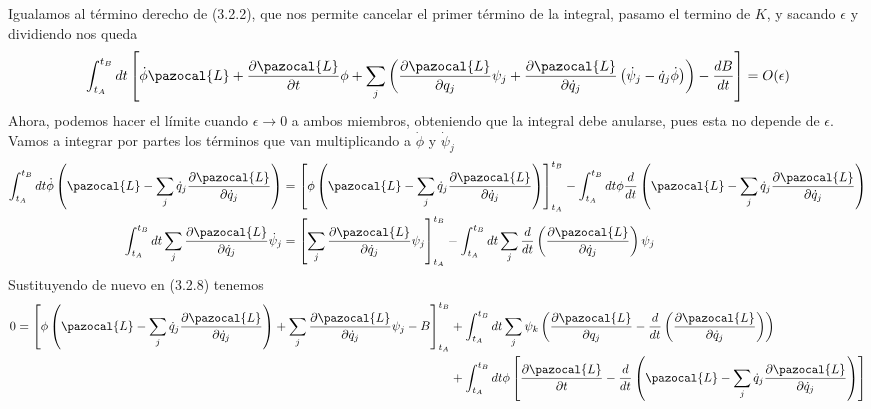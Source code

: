 Igualamos al término derecho de (3.2.2), que nos permite cancelar el primer término de la integral, pasamo el termino de $K$, y sacando $\epsilon$ y dividiendo nos queda
\begin{equation} \label{3.3.2}
    \int_{t_A}^{t_B} dt\left[\dot{\phi}\pazocal{L} +\frac{\partial \pazocal{L}}{\partial t}\phi +\sum_j \left(\frac{\partial \pazocal{L}}{\partial q_j} \psi_j + \frac{\partial \pazocal{L}}{\partial \dot{q}_j} \left(\dot{\psi}_j-\dot{q}_j \dot{\phi}\right)\right)- \frac{dB}{dt}\right] = O(\epsilon)
\end{equation} 
Ahora, podemos hacer el límite cuando $\epsilon \rightarrow 0$ a ambos miembros, obteniendo que la integral debe anularse, pues esta no depende de $\epsilon$. Vamos a integrar por partes los términos que van multiplicando a $\dot{\phi}$ y $\dot{\psi}_j$
\begin{equation} \label{3.3.2}
    \begin{split}
        \int_{t_A}^{t_B} dt \dot{\phi}\left(\pazocal{L}-\sum_j \dot{q}_j\frac{\partial \pazocal{L}}{\partial \dot{q}_j}\right) & = \left[\phi \left(\pazocal{L}-\sum_j \dot{q}_j\frac{\partial \pazocal{L}}{\partial \dot{q}_j}\right) \right]_{t_A}^{t_B} - \int_{t_A}^{t_B} dt \phi \frac{d}{dt}\left(\pazocal{L}-\sum_j \dot{q}_j\frac{\partial \pazocal{L}}{\partial \dot{q}_j}\right) \\ 
        \int_{t_A}^{t_B} dt \sum_j \frac{\partial \pazocal{L}}{\partial \dot{q}_j} \dot{\psi}_j & = \left[\sum_j \frac{\partial \pazocal{L}}{\partial \dot{q}_j} \psi_j\right]_{t_A}^{t_B} - \int_{t_A}^{t_B} dt \sum_j \frac{d}{dt}\left(\frac{\partial \pazocal{L}}{\partial \dot{q}_j}\right) \psi_j
    \end{split}  
\end{equation} 
Sustituyendo de nuevo en (3.2.8) tenemos
\begin{equation} \label{3.3.2}
    \begin{split}
        0 =  \left[ \phi \left(\pazocal{L}-\sum_j \dot{q}_j\frac{\partial \pazocal{L}}{\partial \dot{q}_j}\right) +\sum_j \frac{\partial \pazocal{L}}{\partial \dot{q}_j} \psi_j - B\right]_{t_A}^{t_B} & +  \int_{t_A}^{t_B} dt \sum_j \psi_k \left(\frac{\partial \pazocal{L}}{\partial q_j}-\frac{d}{dt}\left(\frac{\partial \pazocal{L}}{\partial \dot{q}_j}\right)\right) \\ 
        &+\int_{t_A}^{t_B} dt \phi\left[\frac{\partial \pazocal{L}}{\partial t} -\frac{d}{dt}\left(\pazocal{L}-\sum_j \dot{q}_j\frac{\partial \pazocal{L}}{\partial \dot{q}_j}\right)\right]
    \end{split} 
\end{equation} 
